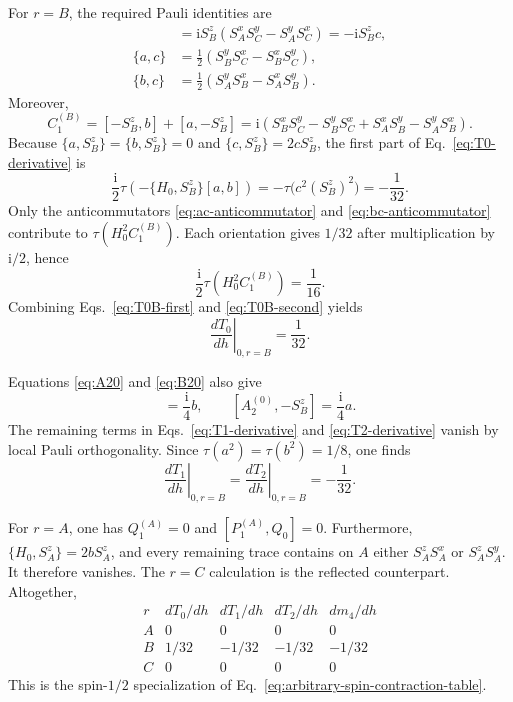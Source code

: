 \documentclass[11pt]{article}
\newcommand{\ii}{\mathrm{i}}
\begin{document}
For $r=B$, the required Pauli identities are
\begin{align}
 [a,b]
 &=\ii S_B^z(S_A^xS_C^y-S_A^yS_C^x)
 =-\ii S_B^zc,
 \label{eq:ab-commutator}\\
 \{a,c\}
 &=\frac12(S_B^yS_C^x-S_B^xS_C^y),
 \label{eq:ac-anticommutator}\\
 \{b,c\}
 &=\frac12(S_A^yS_B^x-S_A^xS_B^y).
 \label{eq:bc-anticommutator}
\end{align}
Moreover,
\begin{equation}
 C_1^{(B)}
 =[-S_B^z,b]+[a,-S_B^z]
 =\ii\left(
 S_B^xS_C^y-S_B^yS_C^x
 +S_A^xS_B^y-S_A^yS_B^x
 \right).
 \label{eq:C1B}
\end{equation}
Because $\{a,S_B^z\}=\{b,S_B^z\}=0$ and
$\{c,S_B^z\}=2cS_B^z$, the first part of
Eq.~\eqref{eq:T0-derivative} is
\begin{equation}
 \frac{\ii}{2}\tau\left(-\{H_0,S_B^z\}[a,b]\right)
 =-\tau\bigl(c^2(S_B^z)^2\bigr)
 =-\frac1{32}.
 \label{eq:T0B-first}
\end{equation}
Only the anticommutators \eqref{eq:ac-anticommutator} and
\eqref{eq:bc-anticommutator} contribute to
$\tau(H_0^2C_1^{(B)})$.  Each orientation gives $1/32$ after multiplication
by $\ii/2$, hence
\begin{equation}
 \frac{\ii}{2}\tau(H_0^2C_1^{(B)})=\frac1{16}.
 \label{eq:T0B-second}
\end{equation}
Combining Eqs.~\eqref{eq:T0B-first} and \eqref{eq:T0B-second} yields
\begin{equation}
 \left.\frac{dT_0}{dh}\right|_{0,r=B}=\frac1{32}.
 \label{eq:T0B-total}
\end{equation}

Equations \eqref{eq:A20} and \eqref{eq:B20} also give
\begin{equation}
 [-S_B^z,B_2^{(0)}]=\frac{\ii}{4}b,
 \qquad
 [A_2^{(0)},-S_B^z]=\frac{\ii}{4}a.
 \label{eq:A2B2-B-commutators}
\end{equation}
The remaining terms in Eqs.~\eqref{eq:T1-derivative} and
\eqref{eq:T2-derivative} vanish by local Pauli orthogonality.  Since
$\tau(a^2)=\tau(b^2)=1/8$, one finds
\begin{equation}
 \left.\frac{dT_1}{dh}\right|_{0,r=B}
 =\left.\frac{dT_2}{dh}\right|_{0,r=B}
 =-\frac1{32}.
 \label{eq:T1T2B}
\end{equation}

For $r=A$, one has $Q_1^{(A)}=0$ and
$[P_1^{(A)},Q_0]=0$.  Furthermore,
\(
\{H_0,S_A^z\}=2bS_A^z
\),
and every remaining trace contains on $A$ either $S_A^zS_A^x$ or
$S_A^zS_A^y$.  It therefore vanishes.  The $r=C$ calculation is the reflected
counterpart.  Altogether,
\begin{equation}
\begin{array}{c|ccc|c}
 r&dT_0/dh&dT_1/dh&dT_2/dh&dm_4/dh\\
 \hline
 A&0&0&0&0\\
 B&1/32&-1/32&-1/32&-1/32\\
 C&0&0&0&0
\end{array}
\label{eq:certificate-table}
\end{equation}
This is the spin-$1/2$ specialization of
Eq.~\eqref{eq:arbitrary-spin-contraction-table}.
\end{document}
